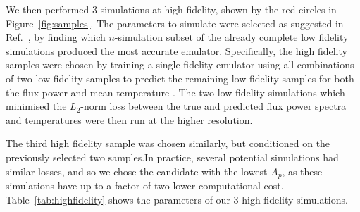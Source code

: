 \documentclass[a4paper,11pt]{article}
\begin{document}
We then performed $3$ simulations at high fidelity, shown by the red circles in Figure~\ref{fig:samples}. The parameters to simulate were selected as suggested in Ref.~\cite{Ho:2022,Fernandez:2022}, by finding which $n$-simulation subset of the already complete low fidelity simulations produced the most accurate emulator. Specifically, the high fidelity samples were chosen by training a single-fidelity emulator using all combinations of two low fidelity samples to predict the remaining low fidelity samples for both the flux power and mean temperature \cite{Ho:2022}. The two low fidelity simulations which minimised the $L_2$-norm loss between the true and predicted flux power spectra and temperatures were then run at the higher resolution.

The third high fidelity sample was chosen similarly, but conditioned on the previously selected two samples.In practice, several potential simulations had similar losses, and so we chose the candidate with the lowest $A_p$, as these simulations have up to a factor of two lower computational cost.
Table~\ref{tab:highfidelity} shows the parameters of our $3$ high fidelity simulations.

\end{document}
